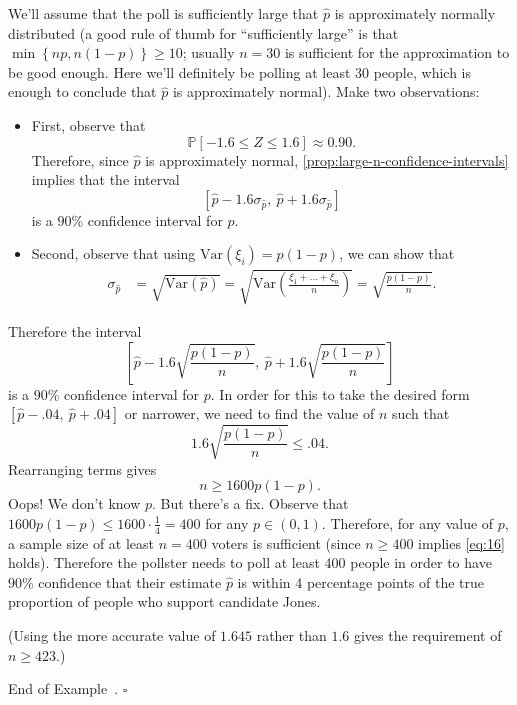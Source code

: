 \documentclass[10pt]{article}
\theoremstyle{definition}
\newtheorem{example}[theorem]{Example}
\renewenvironment{example}
{\begin{oldexample}}
  {\par\smallskip\hfill   End of Example~\theexample. $\square$    \par\end{oldexample}}
\newcommand{\1}[1]{\textbf{1}_{\left[#1\right]}} %
\def\P{\mathbb{P}} %
\def\Var{\mathrm{Var}} %
\begin{document}
\begin{example}[This is like Example 8.9 in the textbook]
  We'll assume that the poll is sufficiently large that $\widehat{p}$ is
  approximately normally distributed (a good rule of thumb for ``sufficiently
  large'' is that $\min \left\{np,n(1-p)\right\}\geq 10$; usually $n=30$ is
  sufficient for the approximation to be good enough. Here we'll definitely be
  polling at least $30$ people, which is enough to conclude that $\widehat{p}$
  is approximately normal). Make two observations:
  \begin{itemize}
    \item First, observe that
    \begin{equation*}
      \P\left[-1.6 \leq Z \leq 1.6\right]\approx 0.90.
    \end{equation*}    
    Therefore, since $\widehat{p}$ is approximately normal,
    \cref{prop:large-n-confidence-intervals} implies that the interval
    \begin{equation*}
      \left[ \widehat{p}-1.6\sigma_{\widehat{p}},\  \widehat{p}+1.6\sigma_{\widehat{p}} \right] 
    \end{equation*}
    is a $90\%$ confidence interval for $p$.
    \item Second, observe that using $\Var(\xi_{i})=p(1-p)$, we can show that
    \begin{align*}
      \sigma_{\widehat{p}} 
      &= \sqrt{\Var(\widehat{p})}
      = \sqrt{\Var \left( \frac{\xi_{1}+\ldots+\xi_{n}}{n} \right) } 
      = \sqrt{\frac{p(1-p)}{n}}.
    \end{align*}
  \end{itemize}
  Therefore the interval
  \begin{equation*}
    \left[ \widehat{p}-1.6 \sqrt{\frac{p(1-p)}{n}},\  \widehat{p}+1.6 \sqrt{\frac{p(1-p)}{n}} \right] 
  \end{equation*}
  is a $90\%$ confidence interval for $p$. In order for this to take the
  desired form $[\widehat{p}-.04,\ \widehat{p}+.04]$ or narrower, we need to
  find the value of $n$ such that
  \begin{equation*}
    1.6 \sqrt{\frac{p(1-p)}{n}} \leq .04.
  \end{equation*}
  Rearranging terms gives
  \begin{equation}\label{eq:16}
    n \geq  1600p(1-p).
  \end{equation}
  Oops! We don't know $p$. But there's a fix. Observe that
  $1600p(1-p) \leq 1600\cdot \frac{1}{4}=400$ for any $p\in (0,1)$. Therefore,
  for any value of $p$, a sample size of at least $n=400$ voters is sufficient
  (since $n \geq 400$ implies \cref{eq:16} holds). Therefore the pollster
  needs to poll at least 400 people in order to have $90\%$ confidence that
  their estimate $\widehat{p}$ is within 4 percentage points of the true
  proportion of people who support candidate Jones.

  (Using the more accurate value of $1.645$ rather than $1.6$ gives the
  requirement of $n \geq 423$.)
\end{example}
\end{document}
